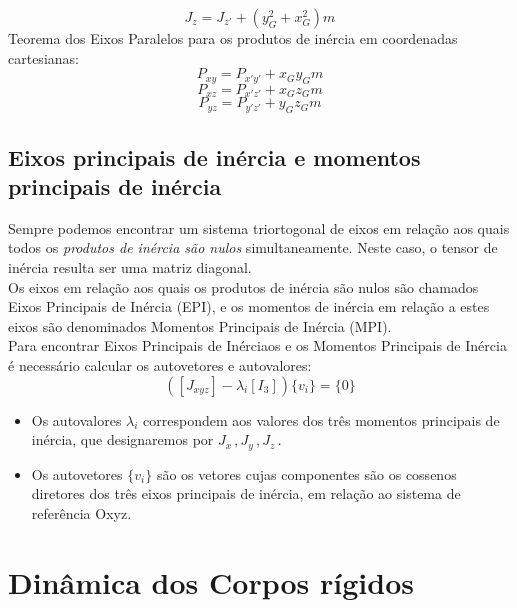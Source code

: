 \documentclass[a4paper, 12pt]{article}
\begin{document}
		\begin{equation}
			J_z = J_{z'} + (y_G^2 + x_G^2)m
		\end{equation}
		Teorema dos Eixos Paralelos para os produtos de inércia em coordenadas cartesianas:
		\begin{equation}
			P_{xy} = P_{x'y'} + x_Gy_Gm
		\end{equation}
		\begin{equation}
			P_{xz} = P_{x'z'} + x_Gz_Gm
		\end{equation}
		\begin{equation}
			P_{yz} = P_{y'z'} + y_Gz_Gm
		\end{equation}

	\subsection{Eixos principais de inércia e momentos principais de inércia}
		Sempre podemos encontrar um sistema triortogonal de eixos em relação aos quais todos os \textit{produtos de inércia são nulos} simultaneamente. Neste caso, o tensor de inércia resulta ser uma matriz diagonal.\\
		
		Os eixos em relação aos quais os produtos de inércia são nulos são chamados Eixos Principais de Inércia (EPI), e os momentos de inércia em relação a estes eixos são denominados Momentos Principais de Inércia (MPI).\\
		
		Para encontrar Eixos Principais de Inérciaos e os Momentos Principais de Inércia é necessário calcular os autovetores e autovalores:
		\begin{equation}
			([J_{xyz}] - \lambda_i[I_3])\{v_i\} = \{0\}
		\end{equation}
		\begin{itemize}
			\item Os autovalores $\lambda_i$ correspondem aos valores dos três momentos principais de inércia, que designaremos por $J_{x~} , J_{y~} , J_{z~}$.
			\item Os autovetores $\{v_i\}$ são os vetores cujas componentes são os cossenos diretores dos três eixos principais de inércia, em relação ao sistema de referência Oxyz.
		\end{itemize}

\newpage
\section{Dinâmica dos Corpos rígidos}
\end{document}
